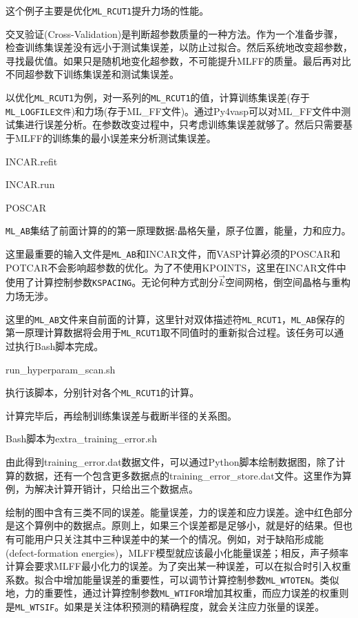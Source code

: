 这个例子主要是优化\texttt{ML\_RCUT1}提升力场的性能。

交叉验证\textrm{(Cross-Validation)}是判断超参数质量的一种方法。作为一个准备步骤，检查训练集误差没有远小于测试集误差，以防止过拟合。然后系统地改变超参数，寻找最优值。如果只是随机地变化超参数，不可能提升\textrm{MLFF}的质量。最后再对比不同超参数下训练集误差和测试集误差。

以优化\texttt{ML\_RCUT1}为例，对一系列的\texttt{ML\_RCUT1}的值，计算训练集误差(存于\texttt{ML\_LOGFILE文件})和力场(存于\textrm{ML\_FF}文件)。通过\textrm{Py4vasp}可以对\textrm{ML\_FF}文件中测试集进行误差分析。在参数改变过程中，只考虑训练集误差就够了。然后只需要基于\textrm{MLFF}的训练集的最小误差来分析测试集误差。

\textrm{INCAR.refit}

\textrm{INCAR.run}

\textrm{POSCAR}

\texttt{ML\_AB}集结了前面计算的的第一原理数据:晶格矢量，原子位置，能量，力和应力。

这里最重要的输入文件是\texttt{ML\_AB}和\textrm{INCAR}文件，而\textrm{VASP}计算必须的\textrm{POSCAR}和\textrm{POTCAR}不会影响超参数的优化。为了不使用\textrm{KPOINTS}，这里在\textrm{INCAR}文件中使用了计算控制参数\texttt{KSPACING}。无论何种方式剖分$\vec k$空间网格，倒空间晶格与重构力场无涉。

这里的\texttt{ML\_AB}文件来自前面的计算，这里针对双体描述符\texttt{ML\_RCUT1}，\texttt{ML\_AB}保存的第一原理计算数据将会用于\texttt{ML\_RCUT1}取不同值时的重新拟合过程。该任务可以通过执行\textrm{Bash}脚本完成。

\textrm{run\_hyperparam\_scan.sh}

执行该脚本，分别针对各个\texttt{ML\_RCUT1}的计算。

计算完毕后，再绘制训练集误差与截断半径的关系图。

\textrm{Bash}脚本为\textrm{extra\_training\_error.sh}

由此得到\textrm{training\_error.dat}数据文件，可以通过\textrm{Python}脚本绘制数据图，除了计算的数据，还有一个包含更多数据点的\textrm{training\_error\_store.dat}文件。这里作为算例，为解决计算开销计，只给出三个数据点。

绘制的图中含有三类不同的误差。能量误差，力的误差和应力误差。途中红色部分是这个算例中的数据点。原则上，如果三个误差都是足够小，就是好的结果。但也有可能用户只关注其中三种误差中的某一个的情况。例如，对于缺陷形成能\textrm{(defect-formation energies)}，\textrm{MLFF}模型就应该最小化能量误差；相反，声子频率计算会要求\textrm{MLFF}最小化力的误差。为了突出某一种误差，可以在拟合时引入权重系数。拟合中增加能量误差的重要性，可以调节计算控制参数\texttt{ML\_WTOTEN}。类似地，力的重要性，通过计算控制参数\texttt{ML\_WTIFOR}增加其权重，而应力误差的权重则是\texttt{ML\_WTSIF}。如果是关注体积预测的精确程度，就会关注应力张量的误差。

